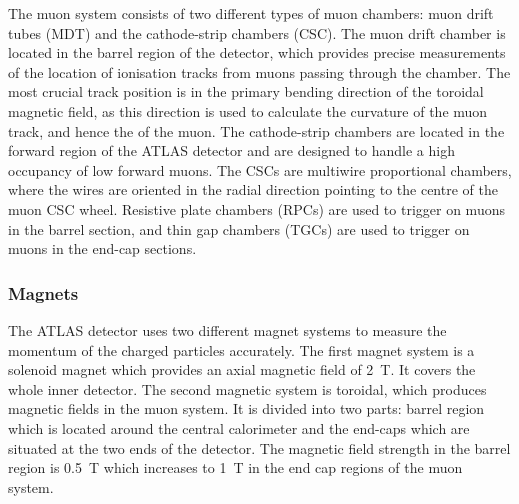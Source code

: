 The muon system consists of two different types of muon chambers: muon drift tubes (MDT) and the cathode-strip chambers (CSC). The muon drift chamber is located in the barrel region of the detector, which provides precise measurements of the location of ionisation tracks from muons passing through the chamber. The most crucial track position is in the primary bending direction of the toroidal magnetic field, as this direction is used to calculate the curvature of the muon track, and hence the \pt of the muon. The cathode-strip chambers are located in the forward region of the ATLAS detector and are designed to handle a high occupancy of low \pt forward muons. The CSCs are multiwire proportional chambers, where the wires are oriented in the radial direction pointing to the centre of the muon CSC wheel. Resistive plate chambers (RPCs) are used to trigger on muons in the barrel section, and thin gap chambers (TGCs) are used to trigger on muons in the end-cap sections.~\cite{atlas}

\subsubsection{Magnets}%
\label{sec:lhcandatlas:atlas:magnets}
The ATLAS detector uses two different magnet systems to measure the momentum of the charged particles accurately. The first magnet system is a solenoid magnet which provides an axial magnetic field of \SI{2}{\tesla}. It covers the whole inner detector. The second magnetic system is toroidal, which produces magnetic fields in the muon system. It is divided into two parts: barrel region which is located around the central calorimeter and the end-caps which are situated at the two ends of the detector. The magnetic field strength in the barrel region is \SI{0.5}{\tesla} which increases to \SI{1}{\tesla} in the end cap regions of the muon system.~\cite{atlas}

